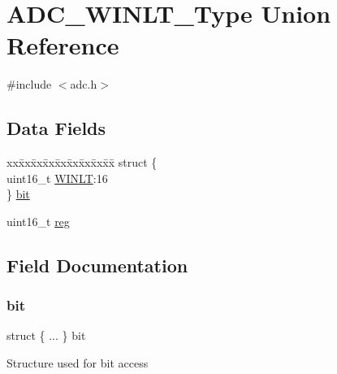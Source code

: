 \hypertarget{union_a_d_c___w_i_n_l_t___type}{}\section{A\+D\+C\+\_\+\+W\+I\+N\+L\+T\+\_\+\+Type Union Reference}
\label{union_a_d_c___w_i_n_l_t___type}


{\ttfamily \#include $<$adc.\+h$>$}

\subsection*{Data Fields}
\begin{DoxyCompactItemize}
\item 
\begin{tabbing}
xx\=xx\=xx\=xx\=xx\=xx\=xx\=xx\=xx\=\kill
struct \{\\
\>uint16\_t \mbox{\hyperlink{union_a_d_c___w_i_n_l_t___type_a31b9ac92e34b3979fa6c52c114197af0}{WINLT}}:16\\
\} \mbox{\hyperlink{union_a_d_c___w_i_n_l_t___type_aff746a4e0c304e1eb2ba16f5c2b5442e}{bit}}\\

\end{tabbing}\item 
uint16\+\_\+t \mbox{\hyperlink{union_a_d_c___w_i_n_l_t___type_a11760f5020019f4aa8cb02e694f7cc44}{reg}}
\end{DoxyCompactItemize}


\subsection{Field Documentation}
\mbox{\label{union_a_d_c___w_i_n_l_t___type_aff746a4e0c304e1eb2ba16f5c2b5442e}} 
\subsubsection{\texorpdfstring{bit}{bit}}
{\footnotesize\ttfamily struct \{ ... \}   bit}

Structure used for bit access \mbox{\label{union_a_d_c___w_i_n_l_t___type_a11760f5020019f4aa8cb02e694f7cc44}} 
